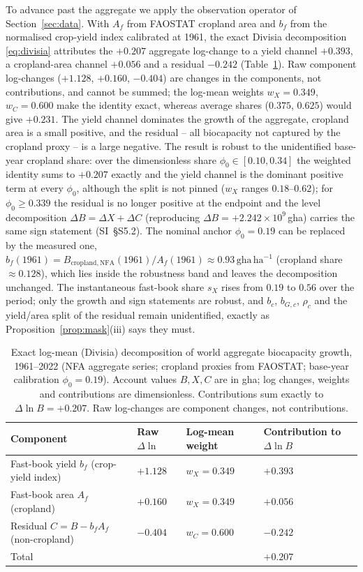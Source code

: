 To advance past the aggregate we apply the observation operator of Section~\ref{sec:data}. With $A_f$ from FAOSTAT cropland area and $b_f$ from the normalised crop-yield index calibrated at 1961, the exact Divisia decomposition \eqref{eq:divisia} attributes the $+0.207$ aggregate log-change to a yield channel $+0.393$, a cropland-area channel $+0.056$ and a residual $-0.242$ (Table~\ref{tab:divisia}). Raw component log-changes ($+1.128$, $+0.160$, $-0.404$) are changes in the components, not contributions, and cannot be summed; the log-mean weights $w_X=0.349$, $w_C=0.600$ make the identity exact, whereas average shares ($0.375$, $0.625$) would give $+0.231$. The yield channel dominates the growth of the aggregate, cropland area is a small positive, and the residual -- all biocapacity not captured by the cropland proxy -- is a large negative. The result is robust to the unidentified base-year cropland share: over the dimensionless share $\phi_0\in[0.10,0.34]$ the weighted identity sums to $+0.207$ exactly and the yield channel is the dominant positive term at every $\phi_0$, although the split is not pinned ($w_X$ ranges $0.18$--$0.62$); for $\phi_0\ge0.339$ the residual is no longer positive at the endpoint and the level decomposition $\Delta B=\Delta X+\Delta C$ (reproducing $\Delta B=+2.242\times10^{9}$\,gha) carries the same sign statement (SI~\S S5.2). The nominal anchor $\phi_0=0.19$ can be replaced by the measured one, $b_f(1961)=B_{\mathrm{cropland,NFA}}(1961)/A_f(1961)\approx0.93\,\mathrm{gha\,ha^{-1}}$ (cropland share $\approx0.128$), which lies inside the robustness band and leaves the decomposition unchanged. The instantaneous fast-book share $s_X$ rises from $0.19$ to $0.56$ over the period; only the growth and sign statements are robust, and $b_c$, $b_{G,c}$, $\rho_c$ and the yield/area split of the residual remain unidentified, exactly as Proposition~\ref{prop:mask}(iii) says they must.

\begin{table}[!htbp]
\centering\small
\caption{Exact log-mean (Divisia) decomposition of world aggregate biocapacity growth, 1961--2022 (NFA aggregate series; cropland proxies from FAOSTAT; base-year calibration $\phi_0=0.19$). Account values $B,X,C$ are in gha; log changes, weights and contributions are dimensionless. Contributions sum exactly to $\Delta\ln B=+0.207$. Raw log-changes are component changes, not contributions.}
\label{tab:divisia}
\begin{tabularx}{\textwidth}{X l l l}
\toprule
Component & Raw $\Delta\ln$ & Log-mean weight & Contribution to $\Delta\ln B$ \\
\midrule
Fast-book yield $b_f$ (crop-yield index) & $+1.128$ & $w_X=0.349$ & $+0.393$ \\
Fast-book area $A_f$ (cropland) & $+0.160$ & $w_X=0.349$ & $+0.056$ \\
Residual $C=B-b_fA_f$ (non-cropland) & $-0.404$ & $w_C=0.600$ & $-0.242$ \\
\midrule
Total & & & $+0.207$ \\
\bottomrule
\end{tabularx}
\end{table}

